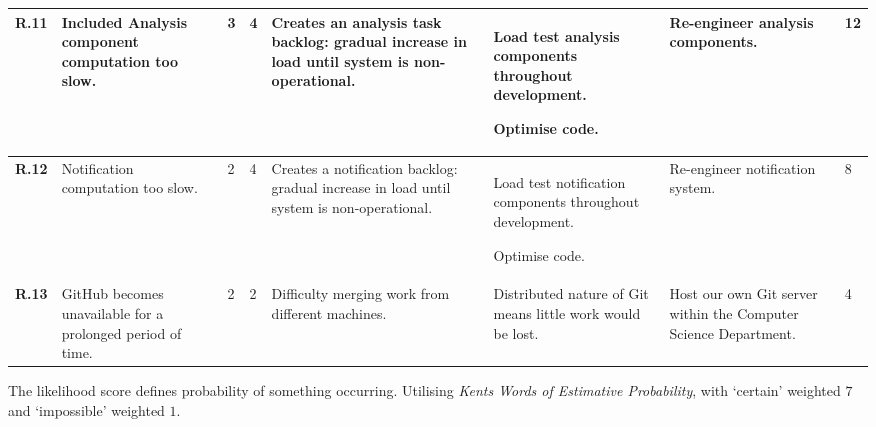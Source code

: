 \begin{longtable}[H]{| p{0.6cm} | p{2.2cm} | p{0.26cm} | p{0.26cm} | p{2.7cm} | p{3cm} | p{2.6cm} | p{0.4cm} |}
  \hline \textbf{R.11}
  & Included Analysis component computation too slow.
  & 3
  & 4
  & Creates an analysis task backlog: gradual increase in load until system
  is non-operational.
  & Load test analysis components throughout development.
  
    Optimise code.
  & Re-engineer analysis components.
  & 12\\  
  
  \hline \textbf{R.12}
  & Notification computation too slow.
  & 2
  & 4
  & Creates a notification backlog: gradual increase in load until system
  is non-operational.
  & Load test notification components throughout development.
 
  Optimise code.
  & Re-engineer notification system.
  & 8\\
  
  \hline \textbf{R.13}
  & GitHub becomes unavailable for a prolonged period of time.
  & 2
  & 2
  & Difficulty merging work from different machines.
  & Distributed nature of Git means little work would be lost.
  & Host our own Git server within the Computer Science Department.
  & 4\\ 
    \hline
\end{longtable}       

The likelihood score defines probability of something occurring. Utilising
\textit{Kents Words of Estimative Probability}\cite{kent1966strategic}, with
`certain' weighted $7$ and `impossible' weighted $1$.


